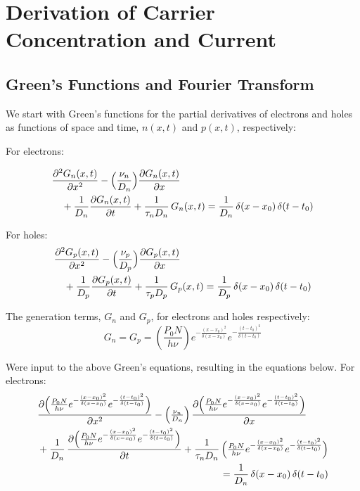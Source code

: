 \documentclass[
  journal,
]{IEEEtran}%
\begin{document}
\section{Derivation of Carrier Concentration and
Current}\label{sec-derivation}

\subsection{Green's Functions and Fourier
Transform}\label{greens-functions-and-fourier-transform}

We start with Green's functions for the partial derivatives of electrons
and holes as functions of space and time, \(n(x,t)\) and \(p(x,t)\),
respectively:

For electrons:

\[
\begin{multlined}
\frac{\partial^2G_n(x,t)}{\partial x^{2}}
- \Bigl(\frac{\nu_n}{D_n}\Bigr)\frac{\partial G_n(x,t)}{\partial x}
\\
+ \frac{1}{D_n}\frac{\partial G_n(x,t)}{\partial t}
+ \frac{1}{\tau_n D_n}\,G_n(x,t)
= \frac{1}{D_n}\,\delta(x - x_0)\,\delta(t - t_0)
\end{multlined}
\]

For holes: \[
\begin{multlined}
\frac{\partial^2G_p(x,t)}{\partial x^{2}}
- \Bigl(\frac{\nu_p}{D_p}\Bigr)\frac{\partial G_p(x,t)}{\partial x}
\\
+ \frac{1}{D_p}\frac{\partial G_p(x,t)}{\partial t}
+ \frac{1}{\tau_p D_p}\,G_p(x,t)
= \frac{1}{D_p}\,\delta(x - x_0)\,\delta(t - t_0)
\end{multlined}
\]

The generation terms, \(G_n\) and \(G_p\), for electrons and holes
respectively: \[
G_n = G_p = \left( \frac{P_0 N}{h \nu} \right)
e^{-\frac{(x - x_0)^2}{\delta(x - x_0)}}
e^{-\frac{(t - t_0)^2}{\delta(t - t_0)}}
\]

Were input to the above Green's equations, resulting in the equations
below. For electrons: \[
\begin{multlined}
\frac{\partial\Bigl(\tfrac{P_0 N}{h\nu}
  e^{-\frac{(x - x_0)^2}{\delta(x - x_0)}}
  e^{-\frac{(t - t_0)^2}{\delta(t - t_0)}}\Bigr)}{\partial x^2}
- \Bigl(\tfrac{\nu_n}{D_n}\Bigr)\,
  \frac{\partial\Bigl(\tfrac{P_0 N}{h\nu}
  e^{-\frac{(x - x_0)^2}{\delta(x - x_0)}}
  e^{-\frac{(t - t_0)^2}{\delta(t - t_0)}}\Bigr)}{\partial x}
\\
+ \frac{1}{D_n}\,
  \frac{\partial\Bigl(\tfrac{P_0 N}{h\nu}
  e^{-\frac{(x - x_0)^2}{\delta(x - x_0)}}
  e^{-\frac{(t - t_0)^2}{\delta(t - t_0)}}\Bigr)}{\partial t}
+ \frac{1}{\tau_n D_n}\,
  \Bigl(\tfrac{P_0 N}{h\nu}
  e^{-\frac{(x - x_0)^2}{\delta(x - x_0)}}
  e^{-\frac{(t - t_0)^2}{\delta(t - t_0)}}\Bigr)
\\
= \frac{1}{D_n}\,\delta(x - x_0)\,\delta(t - t_0)
\end{multlined}
\]
\end{document}
